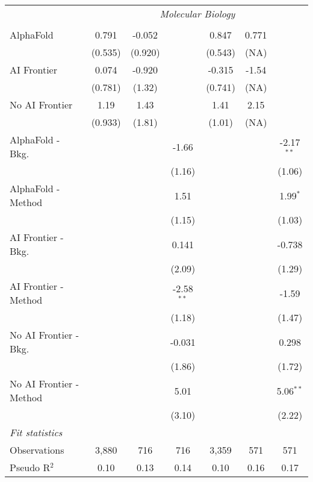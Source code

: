 \begin{tabular}{lcccccc}
 & \multicolumn{6}{c}{\textit{Molecular Biology}} \\ \\
   AlphaFold               & 0.791   & -0.052  &              & 0.847   & 0.771 &   \\   
                           & (0.535) & (0.920) &              & (0.543) & (NA)  &   \\   
   AI Frontier             & 0.074   & -0.920  &              & -0.315  & -1.54 &   \\   
                           & (0.781) & (1.32)  &              & (0.741) & (NA)  &   \\   
   No AI Frontier          & 1.19    & 1.43    &              & 1.41    & 2.15  &   \\   
                           & (0.933) & (1.81)  &              & (1.01)  & (NA)  &   \\   
   AlphaFold - Bkg.        &         &         & -1.66        &         &       & -2.17$^{**}$\\   
                           &         &         & (1.16)       &         &       & (1.06)\\   
   AlphaFold - Method      &         &         & 1.51         &         &       & 1.99$^{*}$\\   
                           &         &         & (1.15)       &         &       & (1.03)\\   
   AI Frontier - Bkg.      &         &         & 0.141        &         &       & -0.738\\   
                           &         &         & (2.09)       &         &       & (1.29)\\   
   AI Frontier - Method    &         &         & -2.58$^{**}$ &         &       & -1.59\\   
                           &         &         & (1.18)       &         &       & (1.47)\\   
   No AI Frontier - Bkg.   &         &         & -0.031       &         &       & 0.298\\   
                           &         &         & (1.86)       &         &       & (1.72)\\   
   No AI Frontier - Method &         &         & 5.01         &         &       & 5.06$^{**}$\\   
                           &         &         & (3.10)       &         &       & (2.22)\\   
   \midrule
   \emph{Fit statistics}\\
   Observations            & 3,880   & 716     & 716          & 3,359   & 571   & 571\\  
   Pseudo R$^2$            & 0.10    & 0.13    & 0.14         & 0.10    & 0.16  & 0.17\\  
   

\end{tabular}
